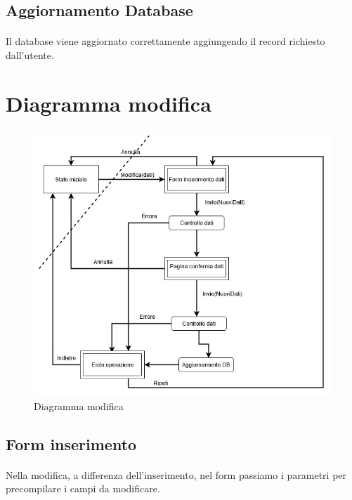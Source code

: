 \documentclass[a4paper, 12pt]{report}
\begin{document}
            \subsection{Aggiornamento Database}
                \paragraph{}Il database viene aggiornato correttamente aggiungendo il record richiesto dall'utente.
        \section{Diagramma modifica}
            \begin{figure}[ht]
                \centering
                \includegraphics[scale=0.5]{Immagini/ModificaDiagramma.jpg}
                \caption{Diagramma modifica}
            \end{figure}
            \subsection{Form inserimento}
                \paragraph{}Nella modifica, a differenza dell'inserimento, nel form passiamo i parametri per precompilare i campi da modificare.
        \clearpage
\end{document}
